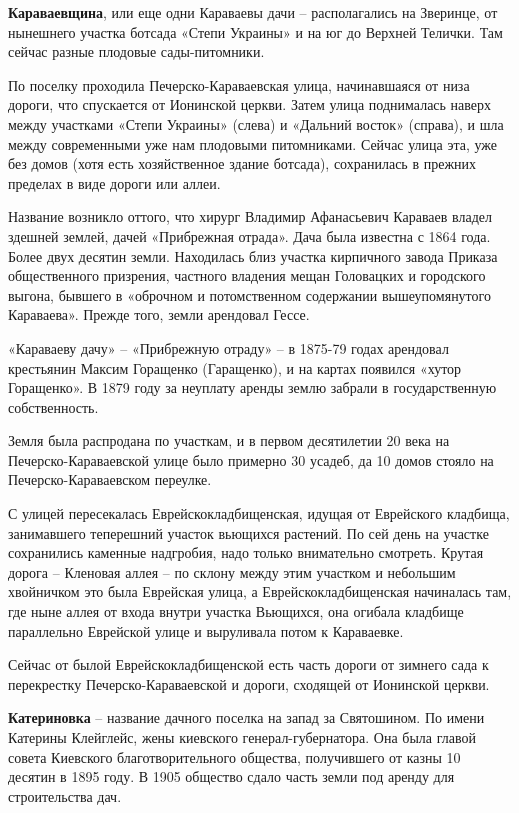 \medskip

\textbf{Караваевщина}, или еще одни Караваевы дачи – располагались на Зверинце, от нынешнего участка ботсада «Степи Украины» и на юг до Верхней Телички. Там сейчас разные плодовые сады-питомники.

По поселку проходила Печерско-Караваевс\-кая улица, начинавшаяся от низа дороги, что спускается от Ионинской церкви. Затем улица поднималась наверх между участками «Степи Украины» (слева) и «Дальний восток» (справа), и шла между современными уже нам плодовыми питомниками. Сейчас улица эта, уже без домов (хотя есть хозяйственное здание ботсада), сохранилась в прежних пределах в виде дороги или аллеи.

Название возникло оттого, что хирург Владимир Афанасьевич Караваев владел здешней землей, дачей «Прибрежная отрада». Дача была известна с 1864 года. Более двух десятин земли. Находилась близ участка кирпичного завода Приказа общественного призрения, частного владения мещан Головацких и городского выгона, бывшего в «оброчном и потомственном содержании вышеупомянутого Караваева». Прежде того, земли арендовал Гессе.
 
«Караваеву дачу» – «Прибрежную отраду» – в 1875-79 годах арендовал крестьянин Максим Горащенко (Гаращенко), и на картах появился «хутор Горащенко». В 1879 году за неуплату аренды землю забрали в государственную собственность.

Земля была распродана по участкам, и в первом десятилетии 20 века на Печерско-Карава\-евской улице было примерно 30 усадеб, да 10 домов стояло на Печерско-Карава\-евском переулке.

С улицей пересекалась Еврейскокладбищенская, идущая от Еврейского кладбища, занимавшего теперешний участок вьющихся растений. По сей день на участке сохранились каменные надгробия, надо только внимательно смотреть. Крутая дорога – Кленовая аллея – по склону между этим участком и небольшим хвойничком это была Еврейская улица, а Еврейскокладбищенская начиналась там, где ныне аллея от входа внутри участка Вьющихся, она огибала кладбище параллельно Еврейской улице и выруливала потом к Караваевке.

Сейчас от былой Еврейскокладбищенской есть часть дороги от зимнего сада к перекрестку Печерско-Караваевской и дороги, сходящей от Ионинской церкви.\\

\medskip

\textbf{Катериновка} – название дачного поселка на запад за Святошином. По имени Катерины Клейглейс, жены киевского генерал-губерна\-тора. Она была главой совета Киевского благотворительного общества, получившего от казны 10 десятин в 1895 году. В 1905 общество сдало часть земли под аренду для строительства дач.

